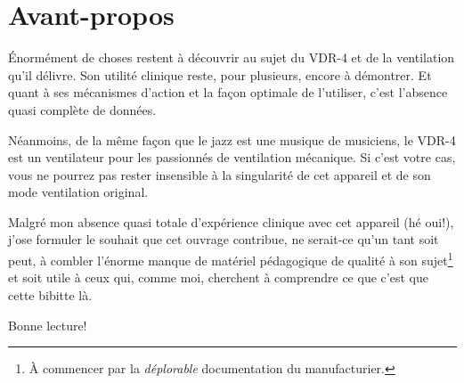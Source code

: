 \chapter{Avant-propos}
Énormément de choses restent à découvrir au sujet du VDR-4 et de la ventilation
qu'il délivre. Son utilité clinique reste, pour plusieurs, encore à démontrer.
Et quant à ses mécanismes d'action et la façon optimale de l'utiliser, c'est
l'absence quasi complète de données.

Néanmoins, de la même façon que le jazz est une musique de musiciens, le VDR-4 est
un ventilateur pour les passionnés de ventilation mécanique.  Si c'est votre
cas, vous ne pourrez pas rester insensible à la singularité de cet appareil et
de son mode ventilation original.

Malgré mon absence quasi totale d'expérience clinique avec cet appareil (hé oui!),
j'ose formuler le souhait que cet ouvrage contribue, ne serait-ce qu'un tant soit peut, à combler l'énorme
manque de matériel pédagogique de qualité à son sujet\footnote{À commencer par la {\em déplorable} documentation du manufacturier.} et soit utile à ceux qui, comme moi,
cherchent à comprendre ce que c'est que cette bibitte là.

Bonne lecture!

\cleardoublepage
\tableofcontents
